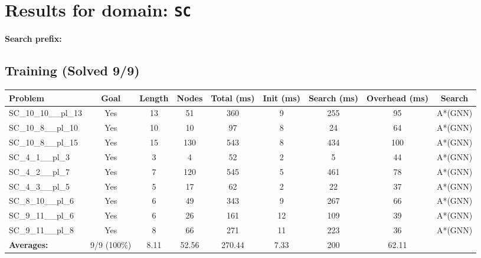 \documentclass{article}
\begin{document}
\section*{Results for domain: \texttt{SC}}
\textbf{Search prefix:} 
\\[0.5cm]
\subsection*{Training (Solved 9/9)}
\begin{tabular}{lcccccccc}
\toprule
Problem & Goal & Length & Nodes & Total (ms) & Init (ms) & Search (ms) & Overhead (ms) & Search \\
\midrule
SC\_10\_10\_\_pl\_13 & Yes & 13 & 51 & 360 & 9 & 255 & 95 & A*(GNN) \\
SC\_10\_8\_\_pl\_10 & Yes & 10 & 10 & 97 & 8 & 24 & 64 & A*(GNN) \\
SC\_10\_8\_\_pl\_15 & Yes & 15 & 130 & 543 & 8 & 434 & 100 & A*(GNN) \\
SC\_4\_1\_\_pl\_3 & Yes & 3 & 4 & 52 & 2 & 5 & 44 & A*(GNN) \\
SC\_4\_2\_\_pl\_7 & Yes & 7 & 120 & 545 & 5 & 461 & 78 & A*(GNN) \\
SC\_4\_3\_\_pl\_5 & Yes & 5 & 17 & 62 & 2 & 22 & 37 & A*(GNN) \\
SC\_8\_10\_\_pl\_6 & Yes & 6 & 49 & 343 & 9 & 267 & 66 & A*(GNN) \\
SC\_9\_11\_\_pl\_6 & Yes & 6 & 26 & 161 & 12 & 109 & 39 & A*(GNN) \\
SC\_9\_11\_\_pl\_8 & Yes & 8 & 66 & 271 & 11 & 223 & 36 & A*(GNN) \\
\textbf{Averages:} & 9/9 (100\%) & 8.11 & 52.56 & 270.44 & 7.33 & 200 & 62.11 & \\
\bottomrule
\end{tabular}
\\[0.7cm]
\end{document}
